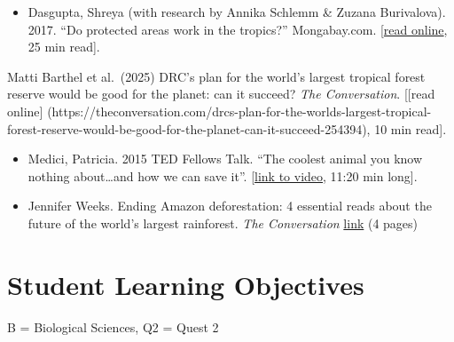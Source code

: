 \documentclass[
  10pt,
  letterpaper,
  oneside,
  open=any]{scrbook}
\providecommand{\tightlist}{%
  \setlength{\itemsep}{0pt}\setlength{\parskip}{0pt}}
\begin{document}
\begin{itemize}
\tightlist
\item
  Dasgupta, Shreya (with research by Annika Schlemm \& Zuzana
  Burivalova). 2017. ``Do protected areas work in the tropics?''
  Mongabay.com.
  {[}\href{https://news.mongabay.com/2017/12/do-protected-areas-work-in-the-tropics/}{read
  online}, 25 min read{]}.
\end{itemize}

Matti Barthel et al.~(2025) DRC's plan for the world's largest tropical
forest reserve would be good for the planet: can it succeed? \emph{The
Conversation}. {[}{[}read online{]}
(https://theconversation.com/drcs-plan-for-the-worlds-largest-tropical-forest-reserve-would-be-good-for-the-planet-can-it-succeed-254394),
10 min read{]}.

\begin{itemize}
\tightlist
\item
  Medici, Patricia. 2015 TED Fellows Talk. ``The coolest animal you know
  nothing about\ldots and how we can save it''.
  {[}\href{https://www.ted.com/talks/patricia_medici_the_coolest_animal_you_know_nothing_about_and_how_we_can_save_it\#t-694653}{link
  to video}, 11:20 min long{]}.
\end{itemize}

\begin{itemize}
\tightlist
\item
  Jennifer Weeks. Ending Amazon deforestation: 4 essential reads about
  the future of the world's largest rainforest. \emph{The Conversation}
  \href{https://theconversation.com/ending-amazon-deforestation-4-essential-reads-about-the-future-of-the-worlds-largest-rainforest-194800}{link}
  (4 pages)
\end{itemize}

\newpage


\chapter{Student Learning Objectives}\label{student-learning-objectives}

B = Biological Sciences, Q2 = Quest 2
\end{document}
